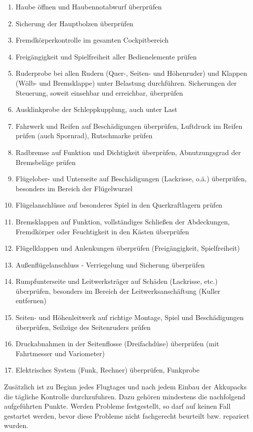 \begin{enumerate}
\item Haube öffnen und Haubennotabwurf überprüfen
\item Sicherung der Hauptbolzen überprüfen
\item Fremdkörperkontrolle im gesamten Cockpitbereich
\item Freigängigkeit und Spielfreiheit aller Bedienelemente prüfen
\item Ruderprobe bei allen Rudern (Quer-, Seiten- und Höhenruder) und Klappen (Wölb- und Bremsklappe) unter Belastung durchführen. Sicherungen der Steuerung, soweit einsehbar und erreichbar, überprüfen
\item Ausklinkprobe der Schleppkupplung, auch unter Last
\item Fahrwerk und Reifen auf Beschädigungen überprüfen, Luftdruck im Reifen prüfen (auch Spornrad), Rutschmarke prüfen
\item Radbremse auf Funktion und Dichtigkeit überprüfen, Abnutzungsgrad der Bremsbeläge prüfen
\item Flügelober- und Unterseite auf Beschädigungen (Lackrisse, o.ä.) überprüfen, besonders im Bereich der Flügelwurzel
\item Flügelanschlüsse auf besonderes Spiel in den Querkraftlagern prüfen
\item Bremsklappen auf Funktion, vollständiges Schließen der Abdeckungen, Fremdkörper oder Feuchtigkeit in den Kästen überprüfen
\item Flügelklappen und Anlenkungen überprüfen (Freigängigkeit, Spielfreiheit)
\item Außenflügelanschluss - Verriegelung und Sicherung überprüfen
\item Rumpfunterseite und Leitwerksträger auf Schäden (Lackrisse, etc.) 	überprüfen, besonders im Bereich der Leitwerksanschäftung (Kuller entfernen)
\item Seiten- und Höhenleitwerk auf richtige Montage, Spiel und Beschädigungen 	überprüfen, Seilzüge des Seitenruders prüfen
\item Druckabnahmen in der Seitenflosse (Dreifachdüse) überprüfen (mit 	Fahrtmesser und Variometer)
\item Elektrisches System (Funk, Rechner) überprüfen, 	Funkprobe
\end{enumerate}

Zusätzlich ist zu Beginn jedes Flugtages und nach jedem Einbau der Akkupacks die tägliche
Kontrolle durchzufuhren. Dazu gehören mindestens die nachfolgend aufgeführten Punkte.
Werden Probleme festgestellt, so darf auf keinen Fall gestartet werden, bevor diese
Probleme nicht fachgerecht beurteilt bzw. repariert wurden.


